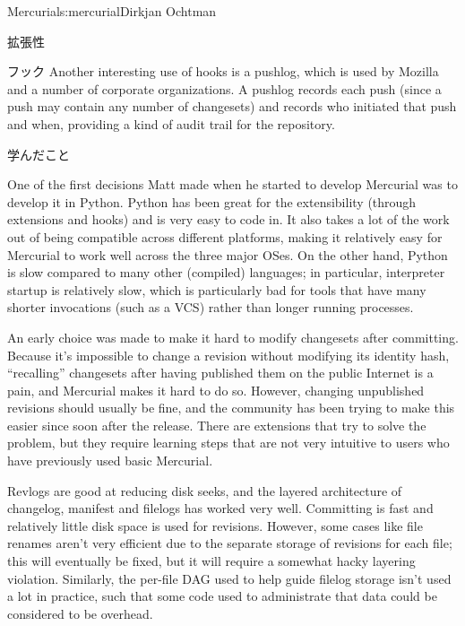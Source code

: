 \begin{aosachapter}{Mercurial}{s:mercurial}{Dirkjan Ochtman}
\begin{aosasect1}{拡張性}
\begin{aosasect2}{フック}
Another interesting use of hooks is a pushlog, which is used by
Mozilla and a number of corporate organizations. A pushlog
records each push (since a push may contain any number of
changesets) and records who initiated that push and when, providing
a kind of audit trail for the repository.

\end{aosasect2}

\end{aosasect1}

\begin{aosasect1}{学んだこと}

One of the first decisions Matt made when he started to develop
Mercurial was to develop it in Python. Python has been great for the
extensibility (through extensions and hooks) and is very easy to code
in. It also takes a lot of the work out of being compatible across
different platforms, making it relatively easy for Mercurial to work
well across the three major OSes. On the other hand, Python is slow
compared to many other (compiled) languages; in particular,
interpreter startup is relatively slow, which is particularly bad for
tools that have many shorter invocations (such as a VCS) rather than
longer running processes.

An early choice was made to make it hard to modify changesets after
committing. Because it's impossible to change a revision without
modifying its identity hash, ``recalling'' changesets after having
published them on the public Internet is a pain, and Mercurial makes
it hard to do so. However, changing unpublished revisions should
usually be fine, and the community has been trying to make this easier
since soon after the release. There are extensions that try to solve
the problem, but they require learning steps that are not very
intuitive to users who have previously used basic Mercurial.

Revlogs are good at reducing disk seeks, and the layered architecture
of changelog, manifest and filelogs has worked very well. Committing
is fast and relatively little disk space is used for revisions.
However, some cases like file renames aren't very efficient due to
the separate storage of revisions for each file; this will eventually
be fixed, but it will require a somewhat hacky layering violation.
Similarly, the per-file DAG used to help guide filelog storage isn't
used a lot in practice, such that some code used to administrate
that data could be considered to be overhead.


\end{aosasect1}
\end{aosachapter}
